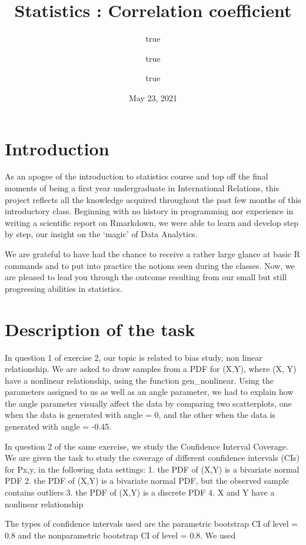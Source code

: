 \documentclass[11pt,]{article}
\title{Statistics : Correlation coefficient}
\author{true \and true \and true}
\date{May 23, 2021}
\begin{document}
\maketitle

\hypertarget{introduction}{%
\section{Introduction}\label{introduction}}

As an apogee of the introduction to statistics course and top off the
final moments of being a first year undergraduate in International
Relations, this project reflects all the knowledge acquired throughout
the past few months of this introductory class. Beginning with no
history in programming nor experience in writing a scientific report on
Rmarkdown, we were able to learn and develop step by step, our insight
on the `magic' of Data Analytics.

We are grateful to have had the chance to receive a rather large glance
at basic R commands and to put into practice the notions seen during the
classes. Now, we are pleased to lead you through the outcome resulting
from our small but still progressing abilities in statistics.

\hypertarget{description-of-the-task}{%
\section{Description of the task}\label{description-of-the-task}}

In question 1 of exercise 2, our topic is related to bias study, non
linear relationship. We are asked to draw samples from a PDF for (X,Y),
where (X, Y) have a nonlinear relationship, using the function
gen\_nonlinear. Using the parameters assigned to us as well as an angle
parameter, we had to explain how the angle parameter visually affect the
data by comparing two scatterplots, one when the data is generated with
angle = 0, and the other when the data is generated with angle = -0.45.

In question 2 of the same exercise, we study the Confidence Interval
Coverage. We are given the task to study the coverage of different
confidence intervals (CIs) for Px,y, in the following data settings: 1.
the PDF of (X,Y) is a bivariate normal PDF 2. the PDF of (X,Y) is a
bivariate normal PDF, but the observed sample contains outliers 3. the
PDF of (X,Y) is a discrete PDF 4. X and Y have a nonlinear relationship

The types of confidence intervals used are the parametric bootstrap CI
of level = 0.8 and the nonparametric bootstrap CI of level = 0.8. We
used
\end{document}
